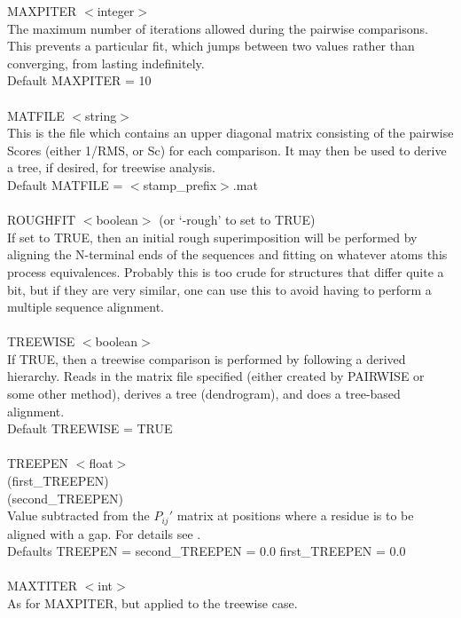     MAXPITER $<$integer$>$\\
    The maximum number of iterations allowed during the pairwise
    comparisons.  This prevents a particular fit, which jumps between
    two values rather than converging, from lasting indefinitely.\\
    Default MAXPITER = 10\\
    \\
    MATFILE $<$string$>$\\
    This is the file which contains an upper diagonal matrix consisting
    of the pairwise Scores (either 1/RMS, or Sc) for each comparison. 
    It may then be used to derive a tree, if desired, for treewise 
    analysis.\\
    Default MATFILE = $<$stamp\_prefix$>$.mat\\
    \\
    ROUGHFIT $<$boolean$>$ (or `-rough' to set to TRUE)\\
    If set to TRUE, then an initial rough superimposition will be
    performed by aligning the N-terminal ends of the sequences and
    fitting on whatever atoms this process equivalences.  Probably
    this is too crude for structures that differ quite a bit, but if
    they are very similar, one can use this to avoid having to
    perform a multiple sequence alignment.\\
    \\
    TREEWISE $<$boolean$>$\\
    If TRUE, then a treewise comparison is performed by following a
    derived hierarchy.   Reads in the matrix file specified (either
    created by PAIRWISE or some other method), derives a tree (dendrogram),
    and does a tree-based alignment.\\
    Default TREEWISE = TRUE\\
    \\
    TREEPEN $<$float$>$\\
    (first\_TREEPEN)\\
    (second\_TREEPEN)\\
    Value subtracted from the $P_{ij}{\prime}$ matrix at positions where a
    residue is to be aligned with a gap.  For details see \cite{rb92b}.\\
    Defaults TREEPEN = second\_TREEPEN = 0.0  first\_TREEPEN = 0.0\\
    \\
    MAXTITER $<$int$>$\\
    As for MAXPITER, but applied to the treewise case.\\
